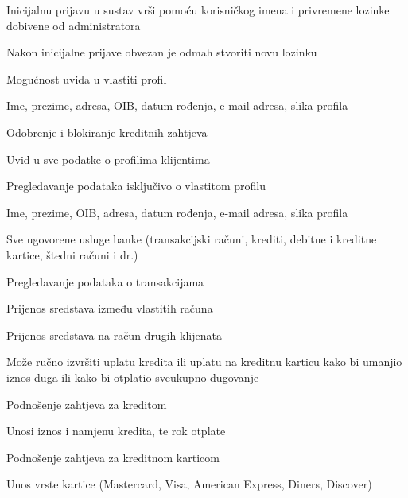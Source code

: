 \begin{packed_enum}
				\begin{packed_enum}
					
					\item Inicijalnu prijavu u sustav vrši pomoću korisničkog imena i privremene lozinke dobivene od administratora
					\begin{packed_enum}
						\item Nakon inicijalne prijave obvezan je odmah stvoriti novu lozinku
					\end{packed_enum}
					\item Mogućnost uvida u vlastiti profil
					\begin{packed_enum}
						\item Ime, prezime, adresa, OIB, datum rođenja, e-mail adresa, slika profila
					\end{packed_enum}
					\item Odobrenje i blokiranje kreditnih zahtjeva
					\item Uvid u sve podatke o profilima klijentima
					
				\end{packed_enum}
				
				\item	\underbar{Klijent banke - inicijator}
				
				\begin{packed_enum}
					
					\item Pregledavanje podataka isključivo o vlastitom profilu
					\begin{packed_enum}
						\item Ime, prezime, OIB, adresa, datum rođenja, e-mail adresa, slika profila
						\item Sve ugovorene usluge banke (transakcijski računi, krediti, debitne i kreditne kartice, štedni računi i dr.)
					\end{packed_enum}
					\item Pregledavanje podataka o transakcijama
					\item Prijenos sredstava između vlastitih računa
					\item Prijenos sredstava na račun drugih klijenata
					\item Može ručno izvršiti uplatu kredita ili uplatu na kreditnu karticu kako bi umanjio iznos duga ili kako bi otplatio sveukupno dugovanje
					\item Podnošenje zahtjeva za kreditom
					\begin{packed_enum}
						\item Unosi iznos i namjenu kredita, te rok otplate
					\end{packed_enum}
					\item Podnošenje zahtjeva za kreditnom karticom
					\begin{packed_enum}
						\item Unos vrste kartice (Mastercard, Visa, American Express, Diners, Discover)
					\end{packed_enum}
					

\end{packed_enum}
\end{packed_enum}

